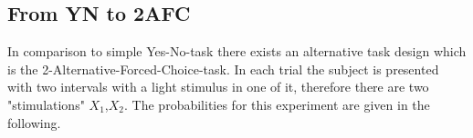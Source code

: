 \documentclass[../main/Notes.tex]{subfiles}
\begin{document}


\subsection{From YN to 2AFC}
In comparison to simple Yes-No-task there exists an alternative task design which is the 2-Alternative-Forced-Choice-task. In each trial the subject is presented with two intervals with a light stimulus in one of it, therefore there are two "stimulations" $X_{1}$,$X_{2}$. The probabilities for this experiment are given in the following.\\
\end{document}
